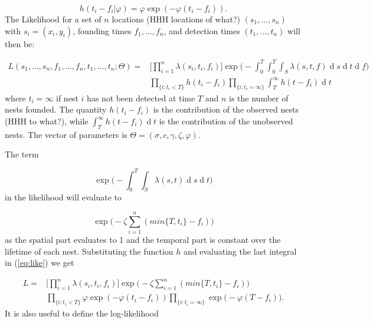 \documentclass{article}
\renewcommand{\d}[1]{\ensuremath{\operatorname{d}\!{#1}}}
\begin{document}
\begin{equation*}
    h(t_{i} - f_{i} | \varphi) = \varphi \exp (- \varphi(t_{i} - f_{i})).
\end{equation*}
The Likelihood for a set of $n$ locations (HHH locations of what?) $(s_{1}, ... , s_{n})$ with $s_i = (x_i, y_i)$, founding times $f_{1}, ... , f_{n}$, and detection times $(t_{1},  ... , t_{n})$ will then be:

\begin{equation} \label{eq:like}
    \begin{aligned}
        L(s_{1}, ..., s_{n}, f_{1}, ..., f_{n}, t_{1}, ..., t_{n} ; \Theta) = & \Bigg[ \prod_{i = 1}^{n} \lambda(s_{i}, t_{i}, f_{i}) \Bigg] \exp \Bigg(- \int_{0}^{T} \int_{0}^{T} \int_{S} \lambda(s, t, f) \d s \d t \d f \Bigg) \\ 
        & \prod_{\{ i : t_{i} < T \} } h(t_{i} - f_{i}) \prod_{ \{ i : t_{i} = \infty \} } \int_{T}^{\infty} h(t - f_{i}) \d t
    \end{aligned}
\end{equation}
where $t_{i} = \infty$ if nest $i$ has not been detected at time $T$ and $n$ is the number of nests founded. The quantity $h(t_{i} - f_{i})$ is the contribution of the observed nests (HHH to what?), while $\int_{T}^{\infty} h(t - f_{i}) \d t$ is the contribution of the unobserved nests. The vector of parameters is $\Theta = ( \sigma, c, \gamma, \zeta, \varphi)$.

The term 

\begin{equation*}
    \exp \bigg(- \int_{0}^{T} \int_{S} \lambda(s, t)\d s \d t \bigg)
\end{equation*}
in the likelihood will evaluate to 

\begin{equation*}
    \exp \bigg(- \zeta \sum_{i=1}^{n} (min\{ T, t_i \} - f_i) \bigg)
\end{equation*}
as the spatial part evaluates to 1 and the temporal part is constant over the lifetime of each nest. Substituting the function $h$ and evaluating the last integral in (\ref{eq:like}) we get

\begin{equation*}
    \begin{aligned}
        L = & \Bigg[ \prod_{i = 1}^{n} \lambda(s_{i}, t_{i}, f_{i}) \Bigg] \exp \bigg(- \zeta \sum_{i=1}^{n} (min\{ T, t_i \} - f_i) \bigg) \\ 
        & \prod_{\{ i : t_{i} < T \} } \varphi \exp (- \varphi (t_{i} - f_{i})) \prod_{ \{ i : t_{i} = \infty \} } \exp \bigg( - \varphi(T - f_{i}) \bigg).
    \end{aligned}
\end{equation*}
It is also useful to define the log-likelihood
\end{document}
